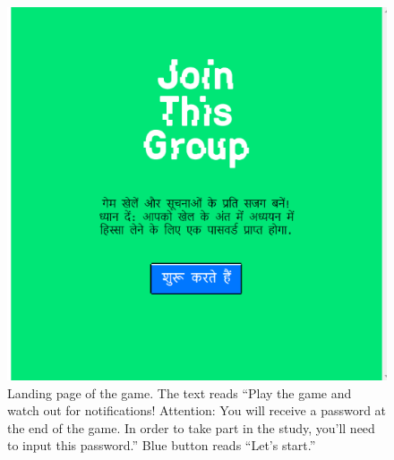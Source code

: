 \documentclass[empirical, authordate, issue]{jote-new-article}
\begin{document}
\begin{figure}[t]

  \begin{fullwidth}
    \includegraphics[width=\linewidth]{media/image2.jpeg}
    \caption{Landing page of the game. The text reads “Play the game and watch out for notifications! Attention: You will receive a password at the end of the game. In order to take part in the study, you'll need to input this password.” Blue button reads “Let's start.” }
    \label{fig:figure2}
  \end{fullwidth}
\end{figure}
\end{document}
